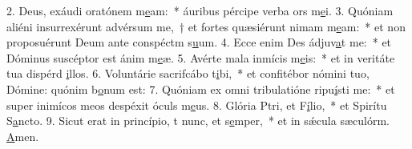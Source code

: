 2. Deus, exáudi oratónem m\uline{e}am:~* áuribus pércipe verba ors m\uline{e}i.
3. Quóniam aliéni insurrexérunt advérsum me,~† et fortes quæsiérunt nimam m\uline{e}am:~* et non proposuérunt Deum ante conspéctm s\uline{u}um.
4. Ecce enim Des ádjuv\uline{a}t me:~* et Dóminus suscéptor est ánim m\uline{e}æ.
5. Avérte mala inmícis m\uline{e}is:~* et in veritáte tua dispérd \uline{i}llos.
6. Voluntárie sacrifcábo t\uline{i}bi,~* et confitébor nómini tuo, Dómine: quónim b\uline{o}num est:
7. Quóniam ex omni tribulatióne ripu\uline{í}sti me:~* et super inimícos meos despéxit óculs m\uline{e}us.
8. Glória Ptri, et F\uline{í}lio,~* et Spirítu S\uline{a}ncto.
9. Sicut erat in princípio, t nunc, et s\uline{e}mper,~* et in sǽcula sæculórm. \uline{A}men.
